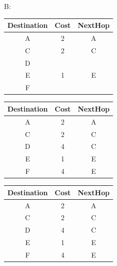 \documentclass[12pt]{article}
\begin{document}
B:\\
\begin{tabular}{|c|c|c|}
	\hline
	Destination & Cost & NextHop \\\hline
	\hline
	A           & 2    & A       \\\hline
	C           & 2    & C       \\\hline
	D           &      &         \\\hline
	E           & 1    & E       \\\hline
	F           &      &         \\\hline
\end{tabular}
\begin{tabular}{|c|c|c|}
	\hline
	Destination & Cost & NextHop \\\hline
	\hline
	A           & 2    & A       \\\hline
	C           & 2    & C       \\\hline
	D           & 4    & C       \\\hline
	E           & 1    & E       \\\hline
	F           & 4    & E       \\\hline
\end{tabular}
\begin{tabular}{|c|c|c|}
	\hline
	Destination & Cost & NextHop \\\hline
	\hline
	A           & 2    & A       \\\hline
	C           & 2    & C       \\\hline
	D           & 4    & C       \\\hline
	E           & 1    & E       \\\hline
	F           & 4    & E       \\\hline
\end{tabular}\\[3mm]
\end{document}
